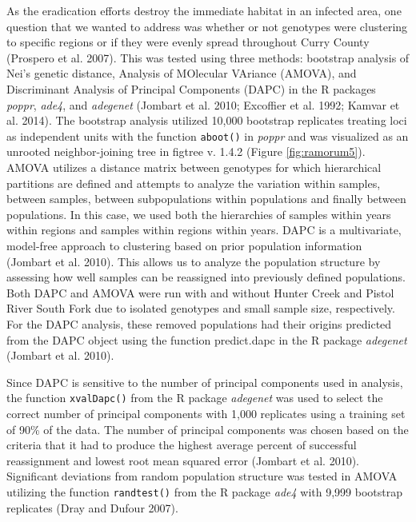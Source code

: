 \documentclass[double,12pt]{beavtex}
\begin{document}
  As the eradication efforts destroy the immediate habitat in an infected
  area, one question that we wanted to address was whether or not
  genotypes were clustering to specific regions or if they were evenly
  spread throughout Curry County (Prospero et al. 2007). This was tested
  using three methods: bootstrap analysis of Nei's genetic distance,
  Analysis of MOlecular VAriance (AMOVA), and Discriminant Analysis of
  Principal Components (DAPC) in the R packages \emph{poppr}, \emph{ade4},
  and \emph{adegenet} (Jombart et al. 2010; Excoffier et al. 1992; Kamvar
  et al. 2014). The bootstrap analysis utilized 10,000 bootstrap
  replicates treating loci as independent units with the function
  \texttt{aboot()} in \emph{poppr} and was visualized as an unrooted
  neighbor-joining tree in figtree v. 1.4.2 (Figure \ref{fig:ramorum5}).
  AMOVA utilizes a distance matrix between genotypes for which
  hierarchical partitions are defined and attempts to analyze the
  variation within samples, between samples, between subpopulations within
  populations and finally between populations. In this case, we used both
  the hierarchies of samples within years within regions and samples
  within regions within years. DAPC is a multivariate, model-free approach
  to clustering based on prior population information (Jombart et al.
  2010). This allows us to analyze the population structure by assessing
  how well samples can be reassigned into previously defined populations.
  Both DAPC and AMOVA were run with and without Hunter Creek and Pistol
  River South Fork due to isolated genotypes and small sample size,
  respectively. For the DAPC analysis, these removed populations had their
  origins predicted from the DAPC object using the function predict.dapc
  in the R package \emph{adegenet} (Jombart et al. 2010).
  
  Since DAPC is sensitive to the number of principal components used in
  analysis, the function \texttt{xvalDapc()} from the R package
  \emph{adegenet} was used to select the correct number of principal
  components with 1,000 replicates using a training set of 90\% of the
  data. The number of principal components was chosen based on the
  criteria that it had to produce the highest average percent of
  successful reassignment and lowest root mean squared error (Jombart et
  al. 2010). Significant deviations from random population structure was
  tested in AMOVA utilizing the function \texttt{randtest()} from the R
  package \emph{ade4} with 9,999 bootstrap replicates (Dray and Dufour
  2007).
  
\end{document}
